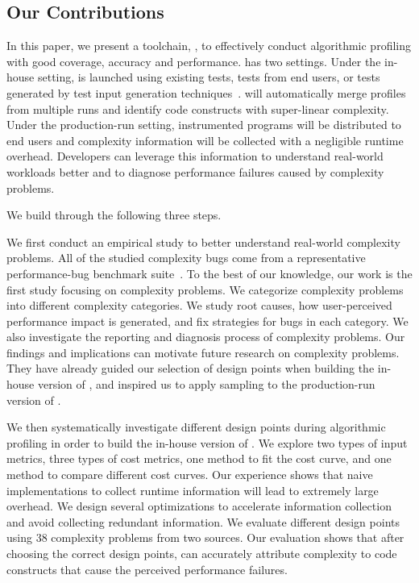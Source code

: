 \subsection{Our Contributions}
\label{sec:con}

In this paper, 
we present a toolchain, \Tool, to effectively conduct algorithmic profiling with 
good coverage, accuracy and performance. 
\Tool has two settings. %
Under the in-house setting, 
\Tool is launched using existing tests, tests from end users, 
or tests generated by test input generation techniques~\cite{KLEE,s2e,dart,EventBreak}. 
\Tool will automatically merge profiles from multiple runs and 
identify code constructs with super-linear complexity. 
Under the production-run setting, 
instrumented programs will be distributed to end users 
and complexity information will be collected with a negligible runtime overhead. 
Developers can leverage this information to understand real-world workloads better
and to diagnose performance failures caused by complexity problems. 


We build \Tool through the following three steps.

We first conduct an empirical study to better understand 
real-world complexity problems.
All of the studied complexity bugs come from a representative 
performance-bug benchmark suite~\cite{PerfBug,SongOOPSLA2014}.
To the best of our knowledge, our work is the first study focusing on complexity problems.
We categorize complexity problems into different complexity categories.
We study root causes, 
how user-perceived performance impact is generated, 
and fix strategies for bugs in each category. 
We also investigate the reporting and diagnosis process of complexity problems.
Our findings and implications can motivate future research on complexity problems. 
They have already guided our selection of design points when building the in-house version of \Tool, 
and inspired us to apply sampling to the production-run version of \Tool. 

We then systematically investigate different design points during algorithmic profiling 
in order to build the in-house version of \Tool. 
We explore two types of input metrics, 
three types of cost metrics, 
one method to fit the cost curve, 
and one method to compare different cost curves. 
Our experience shows that naive implementations 
to collect runtime information
will lead to extremely large overhead. 
We design several optimizations to accelerate information collection 
and avoid collecting redundant information.  
We evaluate different design points 
using $38$ complexity problems from two sources. 
Our evaluation shows that after choosing the correct design points, 
\Tool can accurately attribute complexity to code constructs 
that cause the perceived performance failures. 


